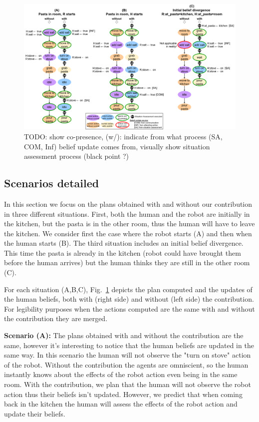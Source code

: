 \documentclass[letterpaper]{article} %
\begin{document}
\begin{figure}
    \centering
    \includegraphics[width=0.97\linewidth]{figures/example_cook.png}
    \caption{TODO: show co-presence, (w/): indicate from what process (SA, COM, Inf) belief update comes from, visually show situation assessment process (black point ?)}
    \label{fig:scenarios}
\end{figure}


\subsection{Scenarios detailed}

In this section we focus on the plans obtained with and without our contribution in three different situations. First, both the human and the robot are initially in the kitchen, but the pasta is in the other room, thus the human will have to leave the kitchen. We consider first the case where the robot starts (A) and then when the human starts (B). The third situation includes an initial belief divergence. This time the pasta is already in the kitchen (robot could have brought them before the human arrives) but the human thinks they are still in the other room (C).  

For each situation (A,B,C), Fig.~\ref{fig:scenarios} depicts the plan computed and the updates of the human beliefs, both with (right side) and without (left side) the contribution. For legibility purposes when the actions computed are the same with and without the contribution they are merged.

\textbf{Scenario (A):} The plans obtained with and without the contribution are the same, however it's interesting to notice that the human beliefs are updated in the same way. In this scenario the human will not observe the "turn on stove" action of the robot. Without the contribution the agents are omniscient, so the human instantly knows about the effects of the robot action even being in the same room. With the contribution, we plan that the human will not observe the robot action thus their beliefs isn't updated. However, we predict that when coming back in the kitchen the human will assess the effects of the robot action and update their beliefs.
\end{document}
